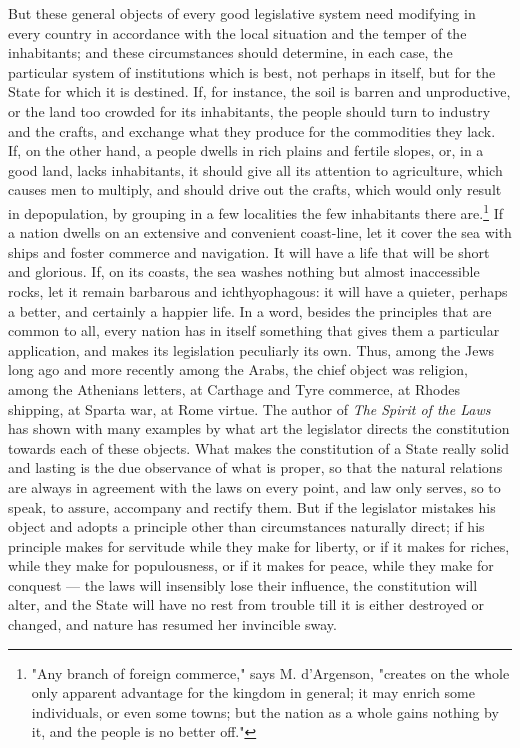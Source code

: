 \documentclass[12pt]{report}
\begin{document}
But these general objects of every good legislative system need modifying in every country in accordance with the local situation and the temper of the inhabitants; and these circumstances should determine, in each case, the particular system of institutions which is best, not perhaps in itself, but for the State for which it is destined. If, for instance, the soil is barren and unproductive, or the land too crowded for its inhabitants, the people should turn to industry and the crafts, and exchange what they produce for the commodities they lack. If, on the other hand, a people dwells in rich plains and fertile slopes, or, in a good land, lacks inhabitants, it should give all its attention to agriculture, which causes men to multiply, and should drive out the crafts, which would only result in depopulation, by grouping in a few localities the few inhabitants there are.\footnote{"Any branch of foreign commerce," says M. d'Argenson, "creates on the whole only apparent advantage for the kingdom in general; it may enrich some individuals, or even some towns; but the nation as a whole gains nothing by it, and the people is no better off."} If a nation dwells on an extensive and convenient coast-line, let it cover the sea with ships and foster commerce and navigation. It will have a life that will be short and glorious. If, on its coasts, the sea washes nothing but almost inaccessible rocks, let it remain barbarous and ichthyophagous: it will have a quieter, perhaps a better, and certainly a happier life. In a word, besides the principles that are common to all, every nation has in itself something that gives them a particular application, and makes its legislation peculiarly its own. Thus, among the Jews long ago and more recently among the Arabs, the chief object was religion, among the Athenians letters, at Carthage and Tyre commerce, at Rhodes shipping, at Sparta war, at Rome virtue. The author of \textit{The Spirit of the Laws} has shown with many examples by what art the legislator directs the constitution towards each of these objects. What makes the constitution of a State really solid and lasting is the due observance of what is proper, so that the natural relations are always in agreement with the laws on every point, and law only serves, so to speak, to assure, accompany and rectify them. But if the legislator mistakes his object and adopts a principle other than circumstances naturally direct; if his principle makes for servitude while they make for liberty, or if it makes for riches, while they make for populousness, or if it makes for peace, while they make for conquest — the laws will insensibly lose their influence, the constitution will alter, and the State will have no rest from trouble till it is either destroyed or changed, and nature has resumed her invincible sway.
\end{document}

